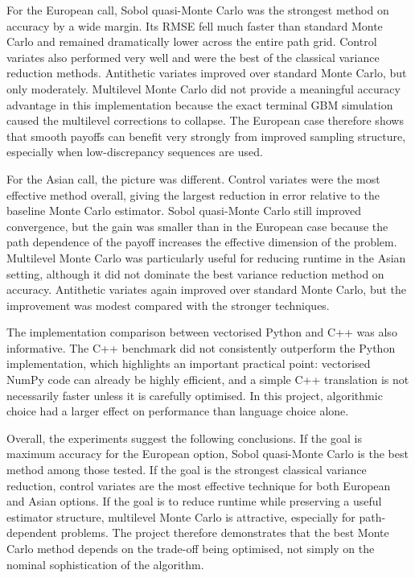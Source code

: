 \documentclass[11pt]{article}
\begin{document}
For the European call, Sobol quasi-Monte Carlo was the strongest method on accuracy by a wide margin. Its RMSE fell much faster than standard Monte Carlo and remained dramatically lower across the entire path grid. Control variates also performed very well and were the best of the classical variance reduction methods. Antithetic variates improved over standard Monte Carlo, but only moderately. Multilevel Monte Carlo did not provide a meaningful accuracy advantage in this implementation because the exact terminal GBM simulation caused the multilevel corrections to collapse. The European case therefore shows that smooth payoffs can benefit very strongly from improved sampling structure, especially when low-discrepancy sequences are used.

For the Asian call, the picture was different. Control variates were the most effective method overall, giving the largest reduction in error relative to the baseline Monte Carlo estimator. Sobol quasi-Monte Carlo still improved convergence, but the gain was smaller than in the European case because the path dependence of the payoff increases the effective dimension of the problem. Multilevel Monte Carlo was particularly useful for reducing runtime in the Asian setting, although it did not dominate the best variance reduction method on accuracy. Antithetic variates again improved over standard Monte Carlo, but the improvement was modest compared with the stronger techniques.

The implementation comparison between vectorised Python and C++ was also informative. The C++ benchmark did not consistently outperform the Python implementation, which highlights an important practical point: vectorised NumPy code can already be highly efficient, and a simple C++ translation is not necessarily faster unless it is carefully optimised. In this project, algorithmic choice had a larger effect on performance than language choice alone.

Overall, the experiments suggest the following conclusions. If the goal is maximum accuracy for the European option, Sobol quasi-Monte Carlo is the best method among those tested. If the goal is the strongest classical variance reduction, control variates are the most effective technique for both European and Asian options. If the goal is to reduce runtime while preserving a useful estimator structure, multilevel Monte Carlo is attractive, especially for path-dependent problems. The project therefore demonstrates that the best Monte Carlo method depends on the trade-off being optimised, not simply on the nominal sophistication of the algorithm.
\end{document}

